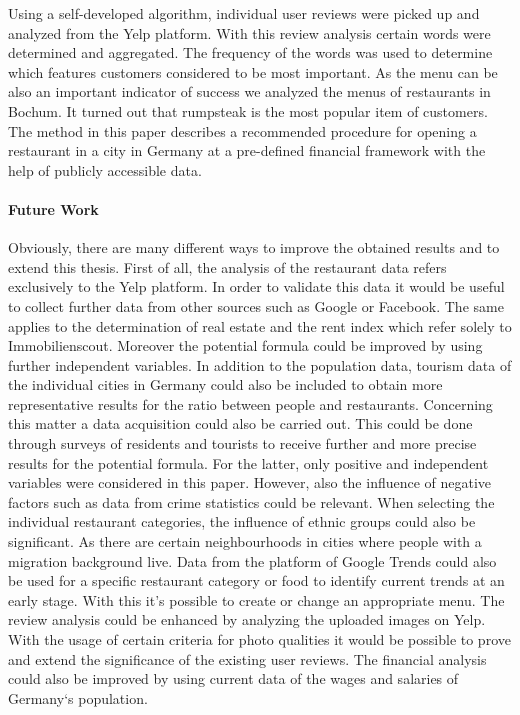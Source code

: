 Using a self-developed algorithm, individual user reviews were picked up and analyzed from the Yelp platform. With this review analysis certain words were determined and aggregated. The frequency of the words was used to determine which features customers considered to be most important. %
\newline
As the menu can be also an important indicator of success we analyzed the menus of restaurants in Bochum. It turned out that rumpsteak is the most popular item of customers.
The method in this paper describes a recommended procedure for opening a restaurant in a city in Germany at a pre-defined financial framework with the help of publicly accessible data.

\paragraph{Future Work}
Obviously, there are many different ways to improve the obtained results and to extend this thesis. First of all, the analysis of the restaurant data refers exclusively to the Yelp platform. In order to validate this data it would be useful to collect further data from other sources such as Google or Facebook. The same applies to the determination of real estate and the rent index which refer solely to Immobilienscout. \newline
Moreover the potential formula could be improved by using further independent variables. In addition to the population data, tourism data of the individual cities in Germany could also be included to obtain more representative results for the ratio between people and restaurants. Concerning this matter a data acquisition could also be carried out. This could be done through surveys of residents and tourists to receive further and more precise results for the potential formula. For the latter, only positive and independent variables were considered in this paper. However, also the influence of negative factors such as data from crime statistics could be relevant. \newline
When selecting the individual restaurant categories, the influence of ethnic groups could also be significant. As there are certain neighbourhoods in cities where people with a migration background live. Data from the platform of Google Trends could also be used for a specific restaurant category or food to identify current trends at an early stage. With this it's possible to create or change an appropriate menu. \newline
The review analysis could be enhanced by analyzing the uploaded images on Yelp. With the usage of certain criteria for photo qualities it would be possible to prove and extend the significance of the existing user reviews. The financial analysis could also be improved by using current data of the wages and salaries of Germany‘s population.